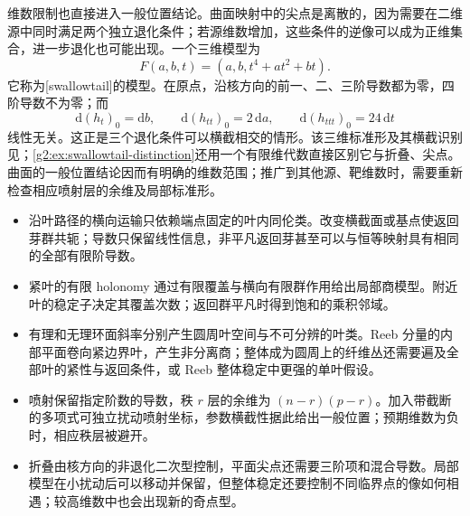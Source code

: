 维数限制也直接进入一般位置结论。曲面映射中的尖点是离散的，因为需要在二维源中同时满足两个独立退化条件；若源维数增加，这些条件的逆像可以成为正维集合，进一步退化也可能出现。一个三维模型为
\begin{equation}\label{g2:eq:swallowtail-model}
	F(a,b,t)=(a,b,t^4+at^2+bt).
\end{equation}
它称为[swallowtail]的模型。在原点，沿核方向的前一、二、三阶导数都为零，四阶导数不为零；而
\[
	\mathrm d(h_t)_0=\mathrm db,\qquad \mathrm d(h_{tt})_0=2\,\mathrm da,\qquad
	\mathrm d(h_{ttt})_0=24\,\mathrm dt
\]
线性无关。这正是三个退化条件可以横截相交的情形。该三维标准形及其横截识别见\cite[第VII章定理4.1]{GolubitskyGuillemin1973}；\cref{g2:ex:swallowtail-distinction}还用一个有限维代数直接区别它与折叠、尖点。曲面的一般位置结论因而有明确的维数范围；推广到其他源、靶维数时，需要重新检查相应喷射层的余维及局部标准形。

\begin{chaptersummary}
	\begin{itemize}
		\item 沿叶路径的横向运输只依赖端点固定的叶内同伦类。改变横截面或基点使返回芽群共轭；导数只保留线性信息，非平凡返回芽甚至可以与恒等映射具有相同的全部有限阶导数。
		\item 紧叶的有限 holonomy 通过有限覆盖与横向有限群作用给出局部商模型。附近叶的稳定子决定其覆盖次数；返回群平凡时得到饱和的乘积邻域。
		\item 有理和无理环面斜率分别产生圆周叶空间与不可分辨的叶类。Reeb 分量的内部平面卷向紧边界叶，产生非分离商；整体成为圆周上的纤维丛还需要遍及全部叶的紧性与返回条件，或 Reeb 整体稳定中更强的单叶假设。
		\item 喷射保留指定阶数的导数，秩 \(r\) 层的余维为 \((n-r)(p-r)\)。加入带截断的多项式可独立扰动喷射坐标，参数横截性据此给出一般位置；预期维数为负时，相应秩层被避开。
		\item 折叠由核方向的非退化二次型控制，平面尖点还需要三阶项和混合导数。局部模型在小扰动后可以移动并保留，但整体稳定还要控制不同临界点的像如何相遇；较高维数中也会出现新的奇点型。
	\end{itemize}
\end{chaptersummary}

\BookExercises

